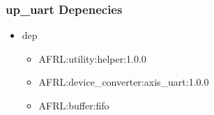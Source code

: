 \subsubsection{up\_uart Depenecies}
\begin{itemize}
\item dep
	\begin{itemize}
	\item AFRL:utility:helper:1.0.0
	\item AFRL:device\_converter:axis\_uart:1.0.0
	\item AFRL:buffer:fifo
	\end{itemize}
\end{itemize}
